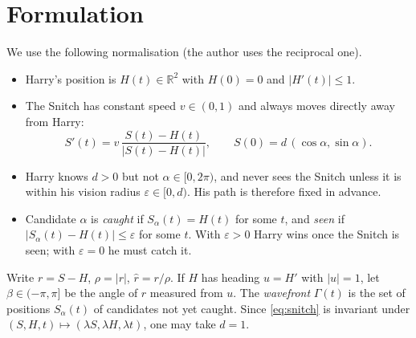 \documentclass[11pt]{article}
\theoremstyle{remark}\newtheorem{remark}{Remark}
\newcommand{\R}{\mathbb{R}}
\newcommand{\rhat}{\hat r}
\begin{document}
\begin{abstract}
area for every path, and a logarithmic spiral from the origin catches at most one direction.
\emph{Conditional results:} exact capture for every $v<v_1\approx0.4748$ (beyond the range $v\le6\cdot10^{-5}$ of
Corollary~\ref{cor:Exact2}), with an explicit time bound, provided one hypothesis on
the end phase of a dyadic discrete chase holds (Theorems~\ref{thm:B2}, \ref{thm:A23}, \ref{thm:A35}); the earlier angle hypothesis (H) is
proved up to that end phase and shown to be false for some finite direction sets. A linear analysis explains the numerical
instabilities at $v=1/2$ and $v\approx0.78$ as properties of the discretisations.
\emph{Checking:} every result added since the first version was checked by at least one independent referee or audit, and the
main theorems by two referees; each link of the chain behind Theorem~\ref{thm:Main} was checked by two independent referees, and
the chain as typeset by two further audits (Remark~\ref{rem:T2-status}). Each new piece of the chain behind
Theorem~\ref{thm:Main2} (Sections~\ref{sec:Estar}, \ref{sec:HTp}, \ref{sec:main2}) was checked by two independent referees, the
assembly with the older core; the assembly's use of the optimised core, its new lemma and the final constants were checked by two
audits (Remark~\ref{rem:T3-status}). Section~\ref{sec:open} states what is missing.
\end{abstract}

\section{Formulation}
We use the following normalisation (the author uses the reciprocal one).
\begin{itemize}
\item Harry's position is $H(t)\in\R^2$ with $H(0)=0$ and $|H'(t)|\le 1$.
\item The Snitch has constant speed $v\in(0,1)$ and always moves directly away from Harry:
\begin{equation}\label{eq:snitch}
S'(t)=v\,\frac{S(t)-H(t)}{|S(t)-H(t)|},\qquad S(0)=d\,(\cos\alpha,\sin\alpha).
\end{equation}
\item Harry knows $d>0$ but not $\alpha\in[0,2\pi)$, and never sees the Snitch unless it is within his vision radius
$\varepsilon\in[0,d)$. His path is therefore fixed in advance.
\item Candidate $\alpha$ is \emph{caught} if $S_\alpha(t)=H(t)$ for some $t$, and \emph{seen} if
$|S_\alpha(t)-H(t)|\le\varepsilon$ for some $t$. With $\varepsilon>0$ Harry wins once the Snitch is seen;
with $\varepsilon=0$ he must catch it.
\end{itemize}
Write $r=S-H$, $\rho=|r|$, $\rhat=r/\rho$. If $H$ has heading $u=H'$ with $|u|=1$, let $\beta\in(-\pi,\pi]$ be the angle of
$r$ measured from $u$. The \emph{wavefront} $\Gamma(t)$ is the set of positions $S_\alpha(t)$ of candidates not yet caught.
Since \eqref{eq:snitch} is invariant under $(S,H,t)\mapsto(\lambda S,\lambda H,\lambda t)$, one may take $d=1$.
\end{document}
